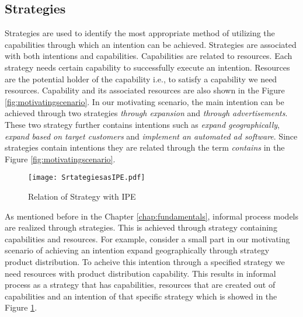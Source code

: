 \subsection{Strategies} 
\label{sec:strategies}
Strategies are used to identify the most appropriate method of utilizing the capabilities through which an intention can be achieved. Strategies are associated with both intentions and capabilities. Capabilities are related to resources. Each strategy needs certain capability to successfully execute an intention. Resources are the potential holder of the capability i.e., to satisfy a capability we need resources. Capability and its associated resources are also shown in the Figure \ref{fig:motivatingscenario}. In our motivating scenario, the main intention can be achieved through two strategies \textit{through expansion} and \textit{through advertisements}. These two strategy further contains intentions such as \textit{expand geographically}, \textit{expand based on target customers} and \textit{implement an automated ad software}. Since strategies contain intentions they are related through the term \textit{contains} in the Figure \ref{fig:motivatingscenario}.

\begin{figure}
	\centering
	\texttt{[image: SrtategiesasIPE.pdf]}
	\caption{Relation of Strategy with IPE}
	\label{fig:strategiesasIPE}
\end{figure}


As mentioned before in the Chapter \ref{chap:fundamentals}, informal process models are realized through strategies. This is achieved through strategy containing capabilities and resources. For example, consider a small part in our motivating scenario of achieving an intention expand geographically through strategy product distribution. To acheive this intention through a specified strategy we need resources with product distribution capability. This results in informal process as a strategy that has capabilities, resources that are created out of capabilities and an intention of that specific strategy which is showed in the Figure \ref{fig:strategiesasIPE}.


